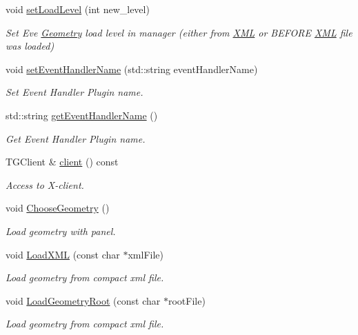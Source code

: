 \begin{DoxyCompactItemize}
void \hyperlink{class_d_d4hep_1_1_display_a40be77ac29040ee1847af97871b78259}{set\+Load\+Level} (int new\+\_\+level)
\begin{DoxyCompactList}\small\item\em Set Eve \hyperlink{namespace_d_d4hep_1_1_geometry}{Geometry} load level in manager (either from \hyperlink{namespace_d_d4hep_1_1_x_m_l}{X\+ML} or B\+E\+F\+O\+RE \hyperlink{namespace_d_d4hep_1_1_x_m_l}{X\+ML} file was loaded) \end{DoxyCompactList}\item 
void \hyperlink{class_d_d4hep_1_1_display_a41734ab371228987decf1ab66c989f56}{set\+Event\+Handler\+Name} (std\+::string event\+Handler\+Name)
\begin{DoxyCompactList}\small\item\em Set Event Handler Plugin name. \end{DoxyCompactList}\item 
std\+::string \hyperlink{class_d_d4hep_1_1_display_a1772bccbb5c196bbf33d9cfadb0ce9ad}{get\+Event\+Handler\+Name} ()
\begin{DoxyCompactList}\small\item\em Get Event Handler Plugin name. \end{DoxyCompactList}\item 
T\+G\+Client \& \hyperlink{class_d_d4hep_1_1_display_afb0dd99044703b6a3ac163621e3d22f1}{client} () const
\begin{DoxyCompactList}\small\item\em Access to X-\/client. \end{DoxyCompactList}\item 
void \hyperlink{class_d_d4hep_1_1_display_aa6b61d0d86f9307e516996d71b38abfa}{Choose\+Geometry} ()
\begin{DoxyCompactList}\small\item\em Load geometry with panel. \end{DoxyCompactList}\item 
void \hyperlink{class_d_d4hep_1_1_display_ade2c0fff0fb152ea4605c30c5516c319}{Load\+X\+ML} (const char $\ast$xml\+File)
\begin{DoxyCompactList}\small\item\em Load geometry from compact xml file. \end{DoxyCompactList}\item 
void \hyperlink{class_d_d4hep_1_1_display_a6f599f1026155bd68b860fa4f9904d62}{Load\+Geometry\+Root} (const char $\ast$root\+File)
\begin{DoxyCompactList}\small\item\em Load geometry from compact xml file. \end{DoxyCompactList}\item 

\end{DoxyCompactItemize}
